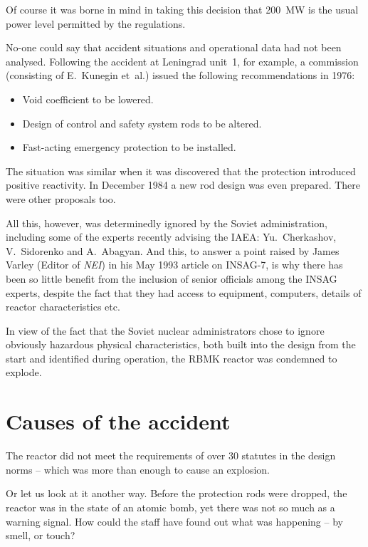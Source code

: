 \documentclass[openright]{bookest}
\begin{document}
Of course it was borne in mind in taking this decision that \qty{200}{\mega\watt} is the usual power level permitted by the regulations.

No-one could say that accident situations and operational data had not been analysed. Following the accident at Leningrad unit~1, for example, a commission (consisting of E.~Kunegin et~al.) issued the following recommendations in 1976:

\begin{itemize}
\item Void coefficient to be lowered.
\item Design of control and safety system rods to be altered.
\item Fast-acting emergency protection to be installed.
\end{itemize}

The situation was similar when it was discovered that the protection introduced positive reactivity. In December 1984 a new rod design was even prepared. There were other proposals too.

All this, however, was determinedly ignored by the Soviet administration, including some of the experts recently advising the IAEA: Yu.~Cherkashov, V.~Sidorenko and A.~Abagyan. And this, to answer a point raised by James Varley (Editor of \textit{NEI}) in his May 1993 article on INSAG-7, is why there has been so little benefit from the inclusion of senior officials among the INSAG experts, despite the fact that they had access to equipment, computers, details of reactor characteristics etc.

In view of the fact that the Soviet nuclear administrators chose to ignore obviously hazardous physical characteristics, both built into the design from the start and identified during operation, the RBMK reactor was condemned to explode.

\section*{Causes of the accident}

The reactor did not meet the requirements of over 30 statutes in the design norms -- which was more than enough to cause an explosion.

Or let us look at it another way. Before the protection rods were dropped, the reactor was in the state of an atomic bomb, yet there was not so much as a warning signal. How could the staff have found out what was happening -- by smell, or touch?
\end{document}
